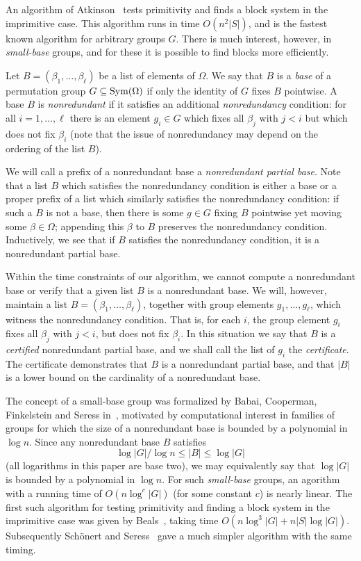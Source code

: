 \documentclass[12pt]{article}
\newcommand{\Sym}{{\rm Sym}}
\begin{document}
An algorithm of Atkinson~\cite{atkinson1975algorithm} tests
primitivity and finds a block system in the imprimitive case.
This algorithm runs in time $O(n^2|S|)$, and is the fastest known
algorithm for arbitrary groups $G$.
There is much interest,
however, in {\em small-base}\/ groups, and for these it
is possible to find blocks more efficiently.

Let $B=(\beta_1,\ldots,\beta_\ell)$ be a list of elements of $\Omega$.
We say that $B$ is a {\em base}\/
of a permutation group $G\subseteq\Sym(\Omega)$
if only the identity of $G$
fixes $B$ pointwise.  A base $B$ is {\em nonredundant}\/
if it satisfies an additional {\em nonredundancy}\/ condition:
for all $i=1,\ldots,\ell$ there is an element $g_i\in G$
which fixes all $\beta_j$ with $j<i$ but which does not
fix $\beta_i$ (note that the issue of nonredundancy may
depend on the ordering of the list $B$).

We will call a prefix of a nonredundant
base a {\em nonredundant partial base}\/.  Note that a
list $B$ which satisfies the nonredundancy condition is either
a base or a proper prefix of a list which similarly satisfies the
nonredundancy condition: if such a $B$ is not a base, then
there is some $g\in G$ fixing $B$ pointwise yet moving some $\beta\in\Omega$;
appending this $\beta$ to $B$ preserves the nonredundancy condition.
Inductively, we see that if $B$ satisfies the nonredundancy condition,
it is a nonredundant partial base.


Within the time constraints
of our algorithm, we cannot compute a nonredundant base
or verify that a given 
list $B$ is a nonredundant base.  We will, however,
maintain a list $B=(\beta_1,\ldots,\beta_\ell)$,
together with group elements $g_1,\ldots,g_\ell$,
which witness the nonredundancy condition.  That is, for each $i$, the group
element $g_i$ fixes all $\beta_j$ with $j<i$, but does
not fix $\beta_i$.
In this situation we say that $B$ is 
a {\em certified}\/ nonredundant partial base,
and we shall call the list of $g_i$ the {\em certificate}\/.
The certificate demonstrates that $B$ is a
nonredundant partial base, and that $|B|$ is a lower bound
on the cardinality of a nonredundant base.



The concept of a small-base group  was formalized
by Babai, Cooperman, Finkelstein and Seress in~\cite{babai1991nearly},
motivated by computational interest in families of groups for which
the size of a nonredundant base is bounded by a polynomial in $\log n$.
Since any nonredundant base $B$ satisfies
$$\log|G|/\log n \leq|B|\leq\log|G|$$
(all logarithms in this paper are base two),
we may equivalently say that $\log|G|$ is bounded by a polynomial in $\log n$.
For such {\em small-base} groups, an
agorithm with a running time of $O(n\log^c|G|)$ (for some constant $c$)
is nearly linear.  The first such algorithm
for testing primitivity and
finding a block system in the imprimitive case was given by
Beals~\cite{Beals1991}, taking time $O(n\log^3|G|+n|S|\log|G|)$.
Subsequently Sch\"onert and Seress~\cite{SchonertSeress1994}
gave a much simpler algorithm with the same timing.
\end{document}
